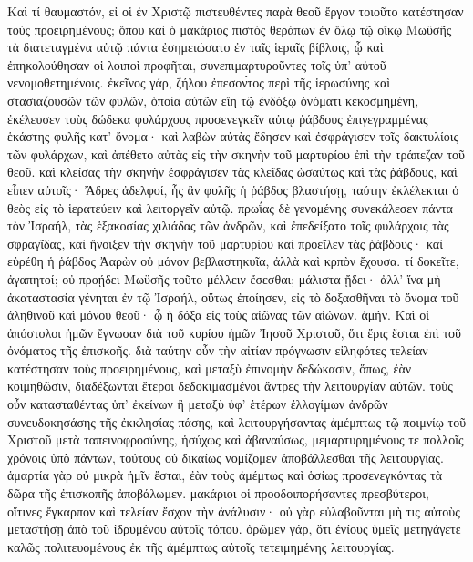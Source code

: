 Καὶ τί θαυμαστόν, εἰ οἱ ἐν Χριστῷ πιστευθέντες παρὰ θεοῦ ἔργον τοιοῦτο κατέστησαν τοὺς προειρημένους; ὅπου καὶ ὁ μακάριος πιστὸς θεράπων ἐν ὅλῳ τῷ οἴκῳ Μωϋσῆς τὰ διατεταγμένα αὐτῷ πάντα ἐσημειώσατο ἐν ταῖς ἱεραῖς βίβλοις, ᾧ καὶ ἐπηκολούθησαν οἱ λοιποὶ προφῆται, συνεπιμαρτυροῦντες τοῖς ὑπ’ αὐτοῦ νενομοθετημένοις. ἐκεῖνος γάρ, ζήλου ἐπεσον́τος περὶ τῆς ἱερωσύνης καὶ στασιαζουσῶν τῶν φυλῶν, ὁποία αὐτῶν εἴη τῷ ἐνδόξῳ ὀνόματι κεκοσμημένη, ἐκέλευσεν τοὺς δώδεκα φυλάρχους προσενεγκεῖν αὐτῳ ῥάβδους ἐπιγεγραμμένας ἑκάστης φυλῆς κατ’ ὄνομα· καὶ λαβὼν αὐτὰς ἔδησεν καὶ ἐσφράγισεν τοῖς δακτυλίοις τῶν φυλάρχων, καὶ ἀπέθετο αὐτὰς εἰς τὴν σκηνὴν τοῦ μαρτυρίου ἐπὶ τὴν τράπεζαν τοῦ θεοῦ. καὶ κλείσας τὴν σκηνὴν ἐσφράγισεν τὰς κλεῖδας ὡσαύτως καὶ τὰς ῥάβδους, καὶ εἶπεν αὐτοῖς· Ἄδρες ἀδελφοί, ἧς ἂν φυλῆς ἡ ῥάβδος βλαστήσῃ, ταύτην ἐκλέλεκται ὁ θεὸς εἰς τὸ ἱερατεύειν καὶ λειτοργεῖν αὐτῷ. πρωΐας δὲ γενομένης συνεκάλεσεν πάντα τὸν Ἰσραήλ, τὰς ἑξακοσίας χιλιάδας τῶν ἀνδρῶν, καὶ ἐπεδείξατο τοῖς φυλάρχοις τὰς σφραγῖδας, καὶ ἤνοιξεν τὴν σκηνὴν τοῦ μαρτυρίου καὶ προεῖλεν τὰς ῥάβδους· καὶ εὑρέθη ἡ ῥάβδος Ἀαρὼν οὐ μόνον βεβλαστηκυῖα, ἀλλὰ καὶ κρπὸν ἔχουσα. τί δοκεῖτε, ἀγαπητοί; οὐ προῄδει Μωϋσῆς τοῦτο μέλλειν ἔσεσθαι; μάλιστα ᾔδει· ἀλλ’ ἵνα μὴ ἀκαταστασία γένηται ἐν τῷ Ἰσραήλ, οὕτως ἐποίησεν, εἰς τὸ δοξασθῆναι τὸ ὄνομα τοῦ ἀληθινοῦ καὶ μόνου θεοῦ· ᾧ ἡ δόξα εἰς τοὺς αἰῶνας τῶν αἰώνων. ἀμήν.
Καὶ οἱ ἀπόστολοι ἡμῶν ἔγνωσαν διὰ τοῦ κυρίου ἡμῶν Ἰησοῦ Χριστοῦ, ὅτι ἔρις ἔσται ἐπὶ τοῦ ὀνόματος τῆς ἐπισκοῆς. διὰ ταύτην οὖν τὴν αἰτίαν πρόγνωσιν εἰληφότες τελείαν κατέστησαν τοὺς προειρημένους, καὶ μεταξὺ ἐπινομὴν δεδώκασιν, ὅπως, ἐὰν κοιμηθῶσιν, διαδέξωνται ἕτεροι δεδοκιμασμένοι ἄντρες τὴν λειτουργίαν αὐτῶν. τοὺς οὖν κατασταθέντας ὑπ’ ἐκείνων ἢ μεταξὺ ὑφ’ ἑτέρων ἐλλογίμων ἀνδρῶν συνευδοκησάσης τῆς ἐκκλησίας πάσης, καὶ λειτουργήσαντας ἀμέμπτως τῷ ποιμνίῳ τοῦ Χριστοῦ μετὰ ταπεινοφροσύνης, ἡσύχως καὶ ἀβαναύσως, μεμαρτυρημένους τε πολλοῖς χρόνοις ὑπὸ πάντων, τούτους οὐ δικαίως νομίζομεν ἀποβάλλεσθαι τῆς λειτουργίας. ἁμαρτία γὰρ οὐ μικρὰ ἡμῖν ἔσται, ἐὰν τοὺς ἀμέμτως καὶ ὁσίως προσενεγκόντας τὰ δῶρα τῆς ἐπισκοπῆς ἀποβάλωμεν. μακάριοι οἱ προοδοιπορήσαντες πρεσβύτεροι, οἵτινες ἔγκαρπον καὶ τελείαν ἔσχον τὴν ἀνάλυσιν· οὐ γὰρ εὐλαβοῦνται μὴ τις αὐτοὺς μεταστήσῃ ἀπὸ τοῦ ἱδρυμένου αὐτοῖς τόπου. ὁρῶμεν γάρ, ὅτι ἐνίους ὑμεῖς μετηγάγετε καλῶς πολιτευομένους ἐκ τῆς ἀμέμπτως αὐτοῖς τετειμημένης λειτουργίας.
